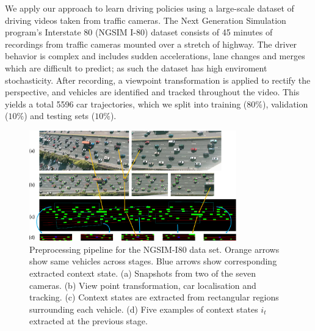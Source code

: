 \documentclass{article} %
\begin{document}
We apply our approach to learn driving policies using a large-scale dataset of driving videos taken from traffic cameras.
The Next Generation Simulation program's Interstate 80 (NGSIM I-80) dataset \citep{NGSIM} consists of 45 minutes of recordings from traffic cameras mounted over a stretch of highway.
The driver behavior is complex and includes sudden accelerations, lane changes and merges which are difficult to predict; as such the dataset has high enviroment stochasticity.
After recording, a viewpoint transformation is applied to rectify the perspective, and vehicles are identified and tracked throughout the video.
This yields a total 5596 car trajectories, which we split into training ($80\%$), validation ($10\%$) and testing sets ($10\%$).

\begin{figure}[t]
  \centering
  \includegraphics[width=0.8\textwidth]{figures/driving/I-80-blue-crop.pdf}
  \caption{
    Preprocessing pipeline for the NGSIM-I80 data set.
    Orange arrows show same vehicles across stages.
    Blue arrows show corresponding extracted context state.
    (a) Snapshots from two of the seven cameras.
    (b) View point transformation, car localisation and tracking.
    (c) Context states are extracted from rectangular regions surrounding each vehicle.
    (d) Five examples of context states $i_t$ extracted at the previous stage.
  }
\label{I-80}
\end{figure}
\end{document}
